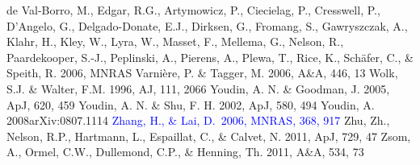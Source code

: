 \documentclass[apj]{emulateapj}
\def\blue#1{\textcolor{blue}{#1}}
\begin{document}
\begin{thebibliography}{}
de Val-Borro, M., Edgar, R.G., Artymowicz, P., Ciecielag, P., Cresswell, P., D'Angelo, G., Delgado-Donate, E.J., Dirksen, G., Fromang, S., Gawryszczak, A., Klahr, H., Kley, W., Lyra, W., Masset, F., Mellema, G., Nelson, R., Paardekooper, S.-J., Peplinski, A., Pierens, A., Plewa, T., Rice, K., Sch\"afer, C., \& Speith, R. 2006, MNRAS
 Varni\`ere, P. \& Tagger, M. 2006, A\&A, 446, 13
 Wolk, S.J. \& Walter, F.M. 1996, AJ, 111, 2066
 Youdin, A. N. \& Goodman, J. 2005, ApJ, 620, 459
 Youdin, A. N. \& Shu, F. H. 2002, ApJ, 580, 494
 Youdin, A. 2008arXiv:0807.1114
\blue{ Zhang, H., \& Lai, D.\ 2006, MNRAS, 368, 917}
 Zhu, Zh., Nelson, R.P., Hartmann, L.,  Espaillat, C., \& Calvet, N. 2011, ApJ, 729, 47
 Zsom, A., Ormel, C.W., Dullemond, C.P., \& Henning, Th. 2011, A\&A, 534, 73
\end{thebibliography}
\end{document}
